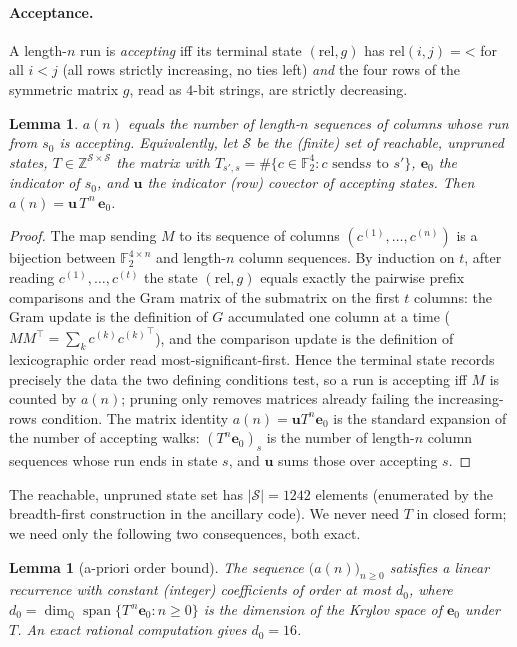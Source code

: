 \documentclass[11pt]{article}
\newtheorem{lemma}[theorem]{Lemma}
\theoremstyle{definition}
\newcommand{\F}{\mathbb{F}_2}
\newcommand{\Z}{\mathbb{Z}}
\begin{document}
\paragraph{Acceptance.}
A length-$n$ run is \emph{accepting} iff its terminal state $(\mathrm{rel},g)$ has
$\mathrm{rel}(i,j)=\texttt{<}$ for all $i<j$ (all rows strictly increasing, no ties left)
\emph{and} the four rows of the symmetric matrix $g$, read as $4$-bit strings, are strictly
decreasing.

\begin{lemma}\label{lem:model}
$a(n)$ equals the number of length-$n$ sequences of columns whose run from $s_0$ is
accepting. Equivalently, let $\mathcal S$ be the (finite) set of reachable, unpruned states,
$T\in\Z^{\mathcal S\times\mathcal S}$ the matrix with $T_{s',s}=\#\{c\in\F^4:\text{$c$ sends
$s$ to $s'$}\}$, $\mathbf e_0$ the indicator of $s_0$, and $\mathbf u$ the indicator
(row) covector of accepting states. Then $a(n)=\mathbf u\,T^{\,n}\,\mathbf e_0$.
\end{lemma}

\begin{proof}
The map sending $M$ to its sequence of columns $(c^{(1)},\dots,c^{(n)})$ is a bijection
between $\F^{4\times n}$ and length-$n$ column sequences. By induction on $t$, after reading
$c^{(1)},\dots,c^{(t)}$ the state $(\mathrm{rel},g)$ equals exactly the pairwise prefix
comparisons and the Gram matrix of the submatrix on the first $t$ columns: the Gram update
is the definition of $G$ accumulated one column at a time ($M M^{\!\top}=\sum_k
c^{(k)}{c^{(k)}}^{\!\top}$), and the comparison update is the definition of lexicographic
order read most-significant-first. Hence the terminal state records precisely the data the
two defining conditions test, so a run is accepting iff $M$ is counted by $a(n)$; pruning
only removes matrices already failing the increasing-rows condition. The matrix identity
$a(n)=\mathbf u T^n\mathbf e_0$ is the standard expansion of the number of accepting walks:
$(T^n\mathbf e_0)_{s}$ is the number of length-$n$ column sequences whose run ends in state
$s$, and $\mathbf u$ sums those over accepting $s$.
\end{proof}

The reachable, unpruned state set has $|\mathcal S|=1242$ elements (enumerated by the
breadth-first construction in the ancillary code). We never need $T$ in closed form; we need
only the following two consequences, both exact.

\begin{lemma}[a-priori order bound]\label{lem:apriori}
The sequence $\bigl(a(n)\bigr)_{n\ge 0}$ satisfies a linear recurrence with constant
(integer) coefficients of order at most $d_0$, where $d_0=\dim_{\mathbb Q}
\operatorname{span}\{T^{\,n}\mathbf e_0 : n\ge 0\}$ is the dimension of the Krylov space of
$\mathbf e_0$ under $T$. An exact rational computation gives $d_0=16$.
\end{lemma}
\end{document}
